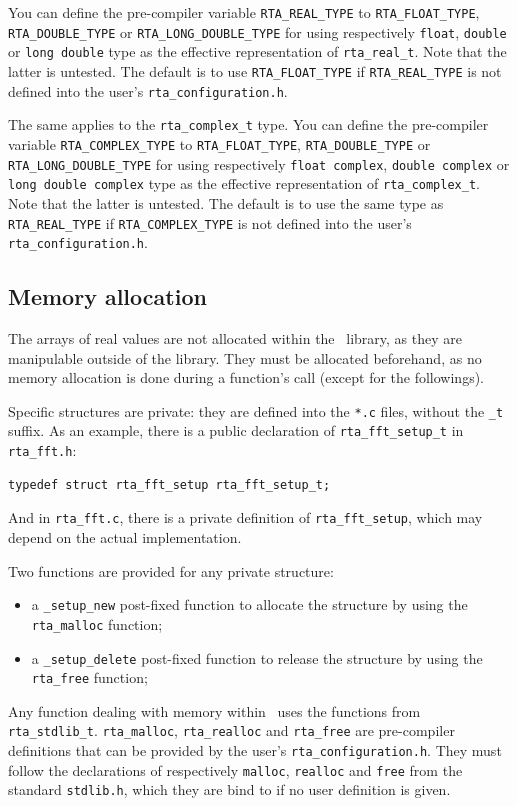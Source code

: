 \documentclass[a4paper, twoside]{article}
\begin{document}
You can define the pre-compiler variable \texttt{RTA\_REAL\_TYPE} to
\texttt{RTA\_FLOAT\_TYPE}, \texttt{RTA\_DOUBLE\_TYPE} or
\texttt{RTA\_LONG\_DOUBLE\_TYPE} for using respectively
\texttt{float}, \texttt{double} or \texttt{long double} type as the
effective representation of \texttt{rta\_real\_t}. Note that the
latter is untested. The default is to use \texttt{RTA\_FLOAT\_TYPE} if
\texttt{RTA\_REAL\_TYPE} is not defined into the user's
\texttt{rta\_configuration.h}.

The same applies to the \texttt{rta\_complex\_t} type. You can define
the pre-compiler variable \texttt{RTA\_COMPLEX\_TYPE} to
\texttt{RTA\_FLOAT\_TYPE}, \texttt{RTA\_DOUBLE\_TYPE} or
\texttt{RTA\_LONG\_DOUBLE\_TYPE} for using respectively \texttt{float
  complex}, \texttt{double complex} or \texttt{long double complex}
type as the effective representation of \texttt{rta\_complex\_t}. Note
that the latter is untested. The default is to use the same type as
\texttt{RTA\_REAL\_TYPE} if \texttt{RTA\_COMPLEX\_TYPE} is not defined
into the user's \texttt{rta\_configuration.h}.


\subsection{Memory allocation}
\label{sec:memory_allocation}

The arrays of real values are not allocated within the \rta\ library,
as they are manipulable outside of the library. They must be allocated
beforehand, as no memory allocation is done during a function's call
(except for the followings).

Specific structures are private: they are defined into the \texttt{*.c}
files, without the \texttt{\_t} suffix. As an example, there is a
public declaration of \texttt{rta\_fft\_setup\_t} in
\texttt{rta\_fft.h}:
\begin{verbatim}
typedef struct rta_fft_setup rta_fft_setup_t;
\end{verbatim}
And in \texttt{rta\_fft.c}, there is a private definition of
\texttt{rta\_fft\_setup}, which may depend on the actual
implementation.

Two functions are provided for any private structure:
\begin{itemize}
\item a \texttt{\_setup\_new} post-fixed function to allocate the
  structure by using the \texttt{rta\_malloc} function;
\item a \texttt{\_setup\_delete} post-fixed function to release the
  structure by using the \texttt{rta\_free} function;
\end{itemize}

Any function dealing with memory within \rta\ uses the functions from
\texttt{rta\_stdlib\_t}. \texttt{rta\_malloc}, \texttt{rta\_realloc}
and \texttt{rta\_free} are pre-compiler definitions that can be
provided by the user's \texttt{rta\_configuration.h}. They must
follow the declarations of respectively \texttt{malloc},
\texttt{realloc} and \texttt{free} from the standard
\texttt{stdlib.h}, which they are bind to if no user definition is
given.
\end{document}
